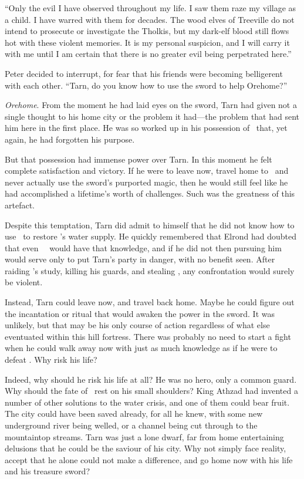 ``Only the evil I have observed throughout my life.  I saw them raze my village as a child.  I have warred with them for decades.  The wood elves of Treeville do not intend to prosecute or investigate the Tholkis, but my dark-elf blood still flows hot with these violent memories.  It is my personal suspicion, and I will carry it with me until I am certain that there is no greater evil being perpetrated here.''

Peter decided to interrupt, for fear that his friends were becoming belligerent with each other.  ``Tarn, do you know how to use the sword to help Orehome?''

\emph{Orehome}.  From the moment he had laid eyes on the sword, Tarn had given not a single thought to his home city or the problem it had---the problem that had sent him here in the first place.  He was so worked up in his possession of \kildir\ that, yet again, he had forgotten his purpose.

But that possession had immense power over Tarn.  In this moment he felt complete satisfaction and victory.  If he were to leave now, travel home to \korbarthrond\ and never actually use the sword's purported magic, then he would still feel like he had accomplished a lifetime's worth of challenges.  Such was the greatness of this artefact.

Despite this temptation, Tarn did admit to himself that he did not know how to use \kildir\ to restore \korbarthrond's water supply.  He quickly remembered that Elrond had doubted that even \mothzam\ \driktur\ would have that knowledge, and if he did not then pursuing him would serve only to put Tarn's party in danger, with no benefit seen.  After raiding \mothzam's study, killing his guards, and stealing \kildir, any confrontation would surely be violent.

Instead, Tarn could leave now, and travel back home.  Maybe he could figure out the incantation or ritual that would awaken the power in the sword.  It was unlikely, but that may be his only course of action regardless of what else eventuated within this hill fortress.  There was probably no need to start a fight when he could walk away now with just as much knowledge as if he were to defeat \mothzam.  Why risk his life?

Indeed, why should he risk his life at all?  He was no hero, only a common guard.  Why should the fate of \korbarthrond\ rest on his small shoulders?  King Athzad had invented a number of other solutions to the water crisis, and one of them could bear fruit.  The city could have been saved already, for all he knew, with some new underground river being welled, or a channel being cut through to the mountaintop streams.  Tarn was just a lone dwarf, far from home entertaining delusions that he could be the saviour of his city.  Why not simply face reality, accept that he alone could not make a difference, and go home now with his life and his treasure sword?

